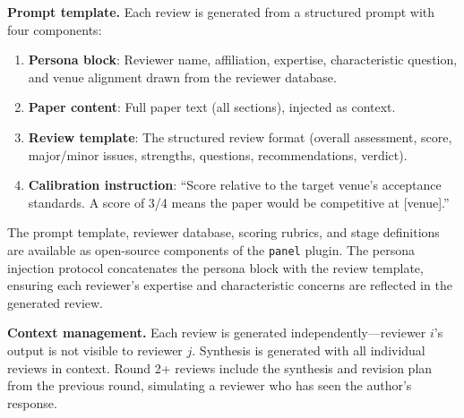 \textbf{Prompt template.} Each review is generated from a structured prompt with four components:
\begin{enumerate}
    \item \textbf{Persona block}: Reviewer name, affiliation, expertise, characteristic question, and venue alignment drawn from the reviewer database.
    \item \textbf{Paper content}: Full paper text (all sections), injected as context.
    \item \textbf{Review template}: The structured review format (overall assessment, score, major/minor issues, strengths, questions, recommendations, verdict).
    \item \textbf{Calibration instruction}: ``Score relative to the target venue's acceptance standards. A score of 3/4 means the paper would be competitive at [venue].''
\end{enumerate}

\noindent The prompt template, reviewer database, scoring rubrics, and stage definitions are available as open-source components of the \texttt{panel} plugin. The persona injection protocol concatenates the persona block with the review template, ensuring each reviewer's expertise and characteristic concerns are reflected in the generated review.

\textbf{Context management.} Each review is generated independently---reviewer $i$'s output is not visible to reviewer $j$. Synthesis is generated with all individual reviews in context. Round 2+ reviews include the synthesis and revision plan from the previous round, simulating a reviewer who has seen the author's response.
